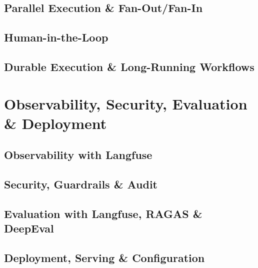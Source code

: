 \chapter{Parallel Execution \& Fan-Out/Fan-In}
\label{ch:parallel}


\chapter{Human-in-the-Loop}
\label{ch:hitl}


\chapter{Durable Execution \& Long-Running Workflows}
\label{ch:durable-execution}



\part{Observability, Security, Evaluation \& Deployment}
\label{part:observability}

\chapter{Observability with Langfuse}
\label{ch:langfuse}


\chapter{Security, Guardrails \& Audit}
\label{ch:security}


\chapter{Evaluation with Langfuse, RAGAS \& DeepEval}
\label{ch:evaluation}


\chapter{Deployment, Serving \& Configuration}
\label{ch:deployment}


